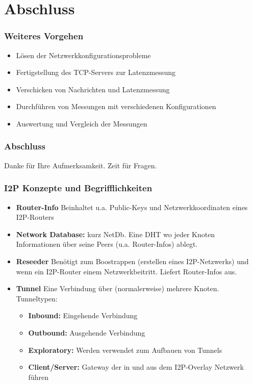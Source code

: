 \documentclass{beamer}
\begin{document}
\section{Abschluss}

    \begin{frame}
        \frametitle{Weiteres Vorgehen}

        \begin{itemize}
            \item Lösen der Netzwerkkonfigurationsprobleme
            \item Fertigstellung des TCP-Servers zur Latenzmessung
            \item Verschicken von Nachrichten und Latenzmessung
            \item Durchführen von Messungen mit verschiedenen Konfigurationen
            \item Auswertung und Vergleich der Messungen
        \end{itemize}
    \end{frame}

    \begin{frame}
        \frametitle{Abschluss}

        Danke für Ihre Aufmerksamkeit.
        \vfill
        Zeit für Fragen.
    \end{frame}


    \bgroup
    \begin{frame}[plain]{}
    \end{frame}
    \egroup

    \begin{frame}
        \frametitle{I2P Konzepte und Begrifflichkeiten}

        \begin{itemize}
            \item \textbf{Router-Info} Beinhaltet u.a. Public-Keys und Netzwerkkoordinaten eines I2P-Routers
            \item \textbf{Network Database:} kurz NetDb. Eine DHT wo jeder Knoten Informationen über seine Peers (u.a. Router-Infos) ablegt.
            \item \textbf{Reseeder} Benötigt zum Boostrappen (erstellen eines I2P-Netzwerks) und wenn ein I2P-Router einem Netzwerkbeitritt. Liefert Router-Infos aus.
            \item \textbf{Tunnel} Eine Verbindung über (normalerweise) mehrere Knoten. Tunneltypen:
                \begin{itemize}
                \item \textbf{Inbound:} Eingehende Verbindung
                \item \textbf{Outbound:} Ausgehende Verbindung
                \item \textbf{Exploratory:} Werden verwendet zum Aufbauen von Tunnels
                \item \textbf{Client/Server:} Gateway der in und aus dem I2P-Overlay Netzwerk führen
                \end{itemize}
        \end{itemize}
    \end{frame} %
\end{document}
